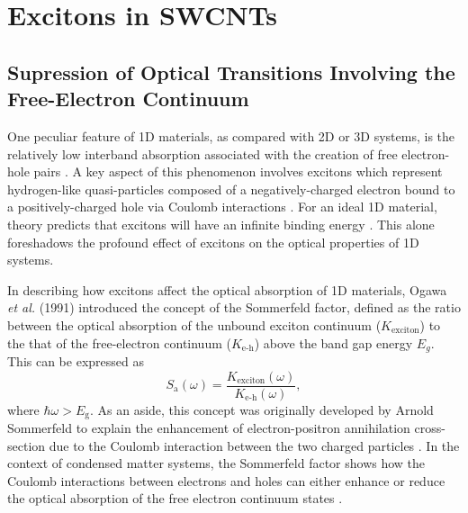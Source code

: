 \section{Excitons in SWCNTs}

\subsection{Supression of Optical Transitions Involving the Free-Electron Continuum}

One peculiar feature of 1D materials, as compared with 2D or 3D systems, is the relatively low interband absorption associated with the creation of free electron-hole pairs \cite{ogawa1991interband}. A key aspect of this phenomenon involves excitons which represent hydrogen-like quasi-particles composed of a negatively-charged electron bound to a positively-charged hole via Coulomb interactions \cite{Ashcroft, kira2011semiconductor}. For an ideal 1D material, theory predicts that excitons will have an infinite binding energy \cite{loudon1959one, elliott1959theory}. This alone foreshadows the profound effect of excitons on the optical properties of 1D systems.

In describing how excitons affect the optical absorption of 1D materials, Ogawa \textit{et al.} (1991) introduced the concept of the Sommerfeld factor, defined as the ratio between the optical absorption of the unbound exciton continuum ($K_\text{exciton}$) to the that of the free-electron continuum ($K_\text{e-h}$) above the band gap energy $E_g$. This can be expressed as
\begin{equation}
	S_\text{a} (\omega) = \frac{K_\text{exciton}(\omega)}{K_\text{e-h}(\omega)},
\end{equation}
where $\hbar \omega > E_\text{g}$. As an aside, this concept was originally developed by Arnold Sommerfeld to explain the enhancement of electron-positron annihilation cross-section due to the Coulomb interaction between the two charged particles \cite{sommerfeld1931beugung}. In the context of condensed matter systems, the Sommerfeld factor shows how the Coulomb interactions between electrons and holes can either enhance or reduce the optical absorption of the free electron continuum states \cite{ogawa1991interband}.

